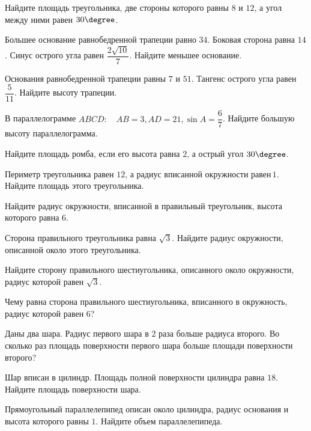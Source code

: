 \begin{consultation}
	\begin{listofex}
		\item Найдите площадь треугольника, две стороны которого равны \(8\) и \(12\), а угол между ними равен \(30 \degree\).
		\item Большее основание равнобедренной трапеции равно \(34\). Боковая сторона равна \(14\). Синус острого угла равен \( \dfrac{ 2\sqrt{10}}{ 7 } \). Найдите меньшее основание.
		\item Основания равнобедренной трапеции равны \(7\) и \(51\). Тангенс острого угла равен \( \dfrac{ 5 }{ 11 } \).  Найдите высоту трапеции.
		\item В параллелограмме \( ABCD: \quad AB  =  3, AD  =  21, \sin A = \dfrac{ 6 }{ 7 } \). Найдите большую высоту параллелограмма.
		\item Найдите площадь ромба, если его высота равна \(2\), а острый угол \(30\degree \).
		\item Периметр треугольника равен \(12\), а радиус вписанной окружности равен \(1\). Найдите площадь этого треугольника.
		\item Найдите радиус окружности, вписанной в правильный треугольник, высота которого равна \(6\).
		\item Сторона правильного треугольника равна \(\sqrt{3}\). Найдите радиус окружности, описанной около этого треугольника.
		\item Найдите сторону правильного шестиугольника, описанного около окружности, радиус которой равен \(\sqrt{3}\).
		\item Чему равна сторона правильного шестиугольника, вписанного в окружность, радиус которой равен \(6\)?
		\item Даны два шара. Радиус первого шара в \(2\) раза больше радиуса второго. Во сколько раз площадь поверхности первого шара больше площади поверхности второго?
		\item Шар вписан в цилиндр. Площадь полной поверхности цилиндра равна \(18\). Найдите площадь поверхности шара.
		\item Прямоугольный параллелепипед описан около цилиндра, радиус основания и высота которого равны \(1\). Найдите объем параллелепипеда.

\end{listofex}
\end{consultation}
